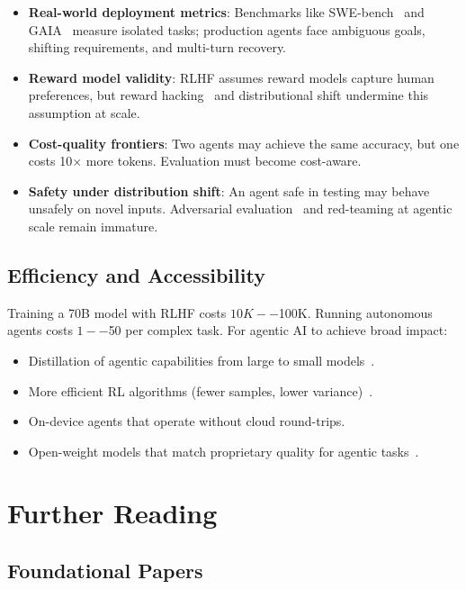 \begin{itemize}
  \item \textbf{Real-world deployment metrics}: Benchmarks like SWE-bench~\cite{jimenez2024swebench} and GAIA~\cite{mialon2023gaia} measure isolated tasks; production agents face ambiguous goals, shifting requirements, and multi-turn recovery.
  \item \textbf{Reward model validity}: RLHF assumes reward models capture human preferences, but reward hacking~\cite{skalse2022defining} and distributional shift undermine this assumption at scale.
  \item \textbf{Cost-quality frontiers}: Two agents may achieve the same accuracy, but one costs 10$\times$ more tokens. Evaluation must become cost-aware.
  \item \textbf{Safety under distribution shift}: An agent safe in testing may behave unsafely on novel inputs. Adversarial evaluation~\cite{perez2022red} and red-teaming at agentic scale remain immature.
\end{itemize}

\subsection{Efficiency and Accessibility}
\label{efficiency-and-accessibility}

Training a 70B model with RLHF costs $10K--$100K. Running autonomous agents costs $1--$50 per complex task. For agentic AI to achieve broad impact:

\begin{itemize}
  \item Distillation of agentic capabilities from large to small models~\cite{hinton2015distilling, kim2024distillation}.
  \item More efficient RL algorithms (fewer samples, lower variance)~\cite{schulman2017proximal}.
  \item On-device agents that operate without cloud round-trips.
  \item Open-weight models that match proprietary quality for agentic tasks~\cite{deepseek2025r1}.
\end{itemize}

\section{Further Reading}
\label{further-reading}

\subsection{Foundational Papers}
\label{foundational-papers}

